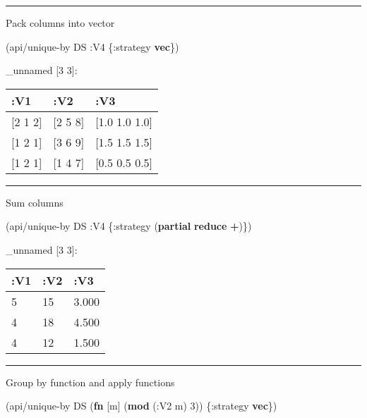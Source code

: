 \documentclass[]{article}
\newenvironment{Shaded}{\begin{snugshade}}{\end{snugshade}}
\newcommand{\KeywordTok}[1]{\textcolor[rgb]{0.13,0.29,0.53}{\textbf{#1}}}
\newcommand{\DecValTok}[1]{\textcolor[rgb]{0.00,0.00,0.81}{#1}}
\newcommand{\AttributeTok}[1]{\textcolor[rgb]{0.77,0.63,0.00}{#1}}
\newcommand{\NormalTok}[1]{#1}
\begin{document}
\begin{center}\rule{0.5\linewidth}{0.5pt}\end{center}

Pack columns into vector

\begin{Shaded}
\begin{Highlighting}[]
\NormalTok{(api/unique-by DS }\AttributeTok{:V4}\NormalTok{ \{}\AttributeTok{:strategy} \KeywordTok{vec}\NormalTok{\})}
\end{Highlighting}
\end{Shaded}

\_unnamed {[}3 3{]}:

\begin{longtable}[]{@{}lll@{}}
\toprule
:V1 & :V2 & :V3\tabularnewline
\midrule
\endhead
{[}2 1 2{]} & {[}2 5 8{]} & {[}1.0 1.0 1.0{]}\tabularnewline
{[}1 2 1{]} & {[}3 6 9{]} & {[}1.5 1.5 1.5{]}\tabularnewline
{[}1 2 1{]} & {[}1 4 7{]} & {[}0.5 0.5 0.5{]}\tabularnewline
\bottomrule
\end{longtable}

\begin{center}\rule{0.5\linewidth}{0.5pt}\end{center}

Sum columns

\begin{Shaded}
\begin{Highlighting}[]
\NormalTok{(api/unique-by DS }\AttributeTok{:V4}\NormalTok{ \{}\AttributeTok{:strategy}\NormalTok{ (}\KeywordTok{partial} \KeywordTok{reduce} \KeywordTok{+}\NormalTok{)\})}
\end{Highlighting}
\end{Shaded}

\_unnamed {[}3 3{]}:

\begin{longtable}[]{@{}lll@{}}
\toprule
:V1 & :V2 & :V3\tabularnewline
\midrule
\endhead
5 & 15 & 3.000\tabularnewline
4 & 18 & 4.500\tabularnewline
4 & 12 & 1.500\tabularnewline
\bottomrule
\end{longtable}

\begin{center}\rule{0.5\linewidth}{0.5pt}\end{center}

Group by function and apply functions

\begin{Shaded}
\begin{Highlighting}[]
\NormalTok{(api/unique-by DS (}\KeywordTok{fn}\NormalTok{ [m] (}\KeywordTok{mod}\NormalTok{ (}\AttributeTok{:V2}\NormalTok{ m) }\DecValTok{3}\NormalTok{)) \{}\AttributeTok{:strategy} \KeywordTok{vec}\NormalTok{\})}
\end{Highlighting}
\end{Shaded}
\end{document}
